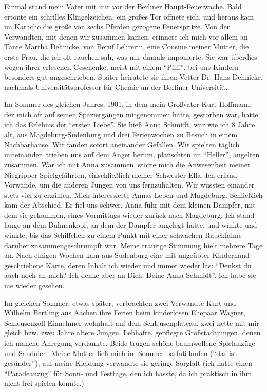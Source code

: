 Einmal stand mein Vater mit mir vor der Berliner Haupt-Feuerwache. Bald ertönte ein schrilles Klingelzeichen, ein großes Tor öffnete sich, und heraus kam im Karacho die große von sechs Pferden gezogene Feuerspritze. Von den Verwandten, mit denen wir zusammen kamen, erinnere ich mich vor allem an Tante Martha Dehnicke, von Beruf Lehrerin, eine Cousine meiner Mutter, die erste Frau, die ich oft rauchen sah, was mir damals imponierte. Sie war überdies wegen ihrer erlesenen Geschenke, meist mit einem \enquote{Pfiff}, bei uns Kindern besonders gut angeschrieben. Später heiratete sie ihren Vetter Dr. Hans Dehnicke, nachmals Universitätsprofessor für Chemie an der Berliner Universität.

Im Sommer des gleichen Jahres, 1901, in dem mein Großvater Kurt Hoffmann, der mich oft auf seinen Spaziergängen mitgenommen hatte, gestorben war, hatte ich das Erlebnis der \enquote{ersten Liebe}. Sie hieß Anna Schmidt, war wie ich 8 Jahre alt, aus Magdeburg-Sudenburg und drei Ferienwochen zu Besuch in einem Nachbarhause. Wir fanden sofort aneinander Gefallen. Wir spielten täglich miteinander, trieben uns auf dem Anger herum, planschten im \enquote{Heller}, angelten zusammen. War ich mit Anna zusammen, störte mich die Anwesenheit meiner Niegripper Spielgefährten, einschließlich meiner Schwester Ella. Ich erfand Vorwände, um die anderen Jungen von uns fernzuhalten. Wir wussten einander stets viel zu erzählen. Mich interessierte Annas Leben und Magdeburg. Schließlich kam der Abschied. Er fiel uns schwer. Anna fuhr mit dem kleinen Dampfer, mit dem sie gekommen, eines Vormittags wieder zurück nach Magdeburg. Ich stand lange an dem Buhnenkopf, an dem der Dampfer angelegt hatte, und winkte und winkte, bis das Schiffchen zu einem Punkt mit einer schwachen Rauchfahne darüber zusammengeschrumpft war. Meine traurige Stimmung hielt mehrere Tage an. Nach einigen Wochen kam aus Sudenburg eine mit ungeübter Kinderhand geschriebene Karte, deren Inhalt ich wieder und immer wieder las: \enquote{Denkst du auch noch an mich? Ich denke aber an Dich. Deine Anna Schmidt}. Ich habe sie nie wieder gesehen.

Im gleichen Sommer, etwas später, verbrachten zwei Verwandte Kurt und Wilhelm Bertling aus Aachen ihre Ferien beim kinderlosen Ehepaar Wagner, Schleusenzoll Einnehmer wohnhaft auf dem Schleusenplateau, zwei nette mit mir gleich bzw. zwei Jahre ältere Jungen. Lebhafte, gepflegte Großstadtjungen, denen ich manche Anregung verdankte. Beide trugen schöne baumwollene Spielanzüge und Sandalen. Meine Mutter ließ mich im Sommer barfuß laufen (\enquote{das ist gesünder}), auf meine Kleidung verwandte sie geringe Sorgfalt (ich hatte einen \enquote{Paradeanzug} für Sonn- und Festtage, den ich hasste, da ich praktisch in ihm nicht frei spielen konnte.)

